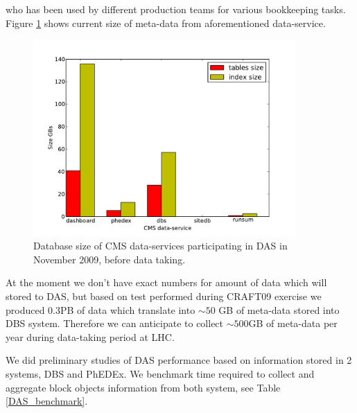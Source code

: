 \documentclass[a4paper]{jpconf}
\begin{document}
who has been used by different production teams for various bookkeeping tasks.
Figure \ref{db_size} shows current size of meta-data from aforementioned data-service.
\begin{figure}[htb]
\centering
\includegraphics[width=100mm]{db_size.pdf}
\caption{
Database size of CMS data-services participating in DAS in November 2009, before
data taking.
}
\label{db_size}
\end{figure}

At the moment we don't have exact numbers for amount of data which will stored to DAS,
but based on test performed during CRAFT09 \cite{CRAFT09}
exercise we produced 0.3PB of data which
translate into $\sim50$ GB of meta-data stored into DBS system. Therefore
we can anticipate to collect $\sim500$GB of meta-data per year during data-taking period
at LHC.

We did preliminary studies of DAS performance based on information stored
in 2 systems, DBS and PhEDEx. We benchmark time required to collect and 
aggregate block objects information from both system, see Table \ref{DAS_benchmark}.
\end{document}
